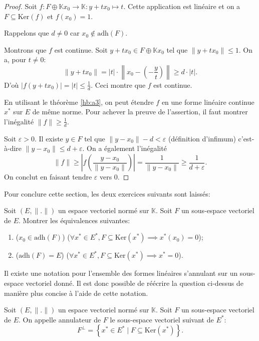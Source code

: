 \begin{proof}
  Soit $f: F\oplus \mathbb{K}x_0\to\mathbb{K}:y+tx_0\mapsto t$.
  Cette application est linéaire et on a $F\subseteq \mathrm{Ker}(f)$
  et $f(x_0)=1$.

  Rappelons que $d\neq 0$ car $x_0\notin \mathrm{adh}(F)$.

  Montrons que $f$ est continue.
  Soit $y + tx_0\in F\oplus \mathbb{K}x_0$ tel que
  $\|y + t x_0\|\leq 1$. On a, pour $t\neq 0$:
  $$\|y + tx_0\| = |t|\cdot
  \left\|x_0 - \left(-\frac{y}{t}\right)\right\|\geq d\cdot |t|.$$
  D'où $|f(y + t x_0)| = |t|\leq \frac{1}{d}$. Ceci montre que $f$
  est continue.

  En utilisant le théorème \ref{hb:a3}, on peut étendre $f$
  en une forme linéaire continue $x^*$ sur $E$ de même norme.
  Pour achever la preuve de l'assertion, il faut montrer l'inégalité
  $\|f\|\geq \frac{1}{d}$.

  Soit $\varepsilon >0$. Il existe $y\in F$ tel que
  $\|y-x_0\| - d <\varepsilon$ (définition d'infimum)
  c'est-à-dire $\| y - x_0\|\leq d + \varepsilon$.
  On a également l'inégalité
  $$\|f\|\geq \left|f\left(\frac{y - x_0}{\| y - x_0\|}\right)\right|
  =\frac{1}{\| y - x_0\|}
  \geq \frac{1}{d+\varepsilon}.$$
  On conclut en faisant tendre $\varepsilon$ vers 0.
\end{proof}

Pour conclure cette section, les deux exercices suivants sont laissés:
\begin{exo}\label{hb:a:exo1}
  Soit $(E, \|.\|)$ un espace vectoriel normé sur $\mathbb{K}$.
  Soit $F$ un sous-espace vectoriel de $E$. Montrer les équivalences
  suivantes:
  \begin{enumerate}
  \item ($x_0\in\mathrm{adh}(F)$) \ssi{} ($\forall x^*\in E^*,
    F\subseteq \mathrm{Ker}(x^*)\implies x^*(x_0) = 0$);
  \item ($\mathrm{adh}(F) = E$)  \ssi{}  ($\forall x^*\in E^*,
    F\subseteq \mathrm{Ker}(x^*)\implies x^* = 0$).
  \end{enumerate}
\end{exo}

Il existe une notation pour l'ensemble des formes linéaires
s'annulant sur un sous-espace vectoriel donné. Il est donc
possible de réécrire la question ci-dessus de manière plus
concise à l'aide de cette notation.

\begin{df}
  Soit $(E, \|.\|)$ un espace vectoriel normé sur $\mathbb{K}$.
  Soit $F$ un sous-espace vectoriel de $E$. On appelle
  annulateur de $F$ le sous-espace vectoriel suivant
  de $E^*$:
  $$F^\perp = \left\{x^*\in E^*\mid F\subseteq \mathrm{Ker}(x^*)\right\}.$$
\end{df}

